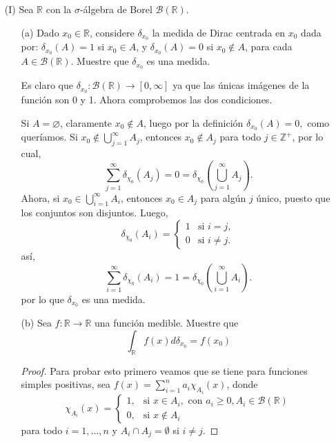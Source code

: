 \begin{itemize}
  
\item[(I)] Sea $\mathbb{R}$ con la $\sigma$-álgebra de Borel $\mathcal{B}(\mathbb{R})$.
\begin{itemize}
\item[(a)] Dado $x_0 \in \mathbb{R}$, considere $\delta_{x_0}$ la medida de Dirac centrada en $x_0$ dada por: $\delta_{x_0}(A)=1$ si $x_0 \in A$, y $\delta_{x_0}(A)=0$ si $x_0 \notin A$, para cada $A \in \mathcal{B}(\mathbb{R})$. Muestre que $\delta_{x_0}$ es una medida.
\begin{sproof}
    Es claro que $\delta_{x_0}:\mathcal{B}(\mathbb{R})\to [0,\infty]$ ya que las únicas imágenes de la función son 0 y 1. Ahora comprobemos las dos condiciones.

    Si $A=\varnothing$, claramente $x_0\notin A$, luego por la definición $\delta_{x_0}(A)=0,$ como queríamos. Si  $x_0 \notin \bigcup_{j=1}^{\infty} A_j $, entonces $x_0 \notin A_j$ para todo $j \in \mathbb{Z^+}$, por lo cual, 
    \[
\sum_{j=1}^{\infty} \delta_{\chi_0}(A_j) = 0 = \delta_{\chi_0}\left(\bigcup_{j=1}^{\infty} A_j\right).
\]
Ahora, si \(x_0 \in \bigcup_{i=1}^{\infty} A_i\), entonces \(x_0 \in A_j\) para algún \(j\) único, puesto que los conjuntos son disjuntos. Luego, 
\[
\delta_{\chi_0}(A_i) = 
\begin{cases}
1 & \text{si } i = j, \\
0 & \text{si } i \neq j.
\end{cases}
\]
así,
\[
\sum_{i=1}^{\infty} \delta_{\chi_0}(A_i) = 1 = \delta_{\chi_0}\left(\bigcup_{i=1}^{\infty} A_i\right).
\]
por lo que $\delta_{x_0}$ es una medida.
\end{sproof}
\item[(b)] Sea $f: \mathbb{R} \rightarrow \mathbb{R}$ una función medible. Muestre que
$$
\int_{\mathbb{R}} f(x) d \delta_{x_0}=f\left(x_0\right)
$$
\begin{proof}
Para probar esto primero veamos que se tiene para funciones simples positivas, sea \( f(x) =\displaystyle \sum_{i=1}^n a_i \chi_{A_i}(x) \), donde 
\[
\chi_{A_i}(x) = \begin{cases} 
1, & \text{si } x \in A_i, \text{ con } a_i \geq 0, A_i \in \mathcal{B}(\mathbb{R}) \\
0, & \text{si } x \notin A_i
\end{cases}
\]
para todo \( i = 1,\dots,n \) y \( A_i \cap A_j = \emptyset \) si \( i \neq j \).


\end{proof}
\end{itemize}
\end{itemize}
